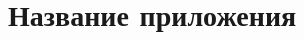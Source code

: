 \documentclass{khsu}
\begin{document}

\tableofcontents








\appendix
\chapter{Название приложения}
\end{document}
